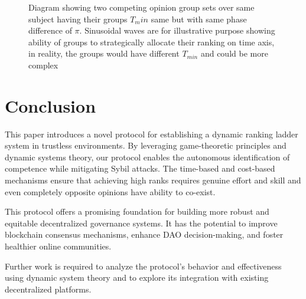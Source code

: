 \documentclass{article}
\begin{document}
\begin{CJK}{UTF8}{gbsn}
\begin{figure}[ht]
\begin{tikzpicture}
        \end{tikzpicture}
        \caption{Diagram showing two competing opinion group sets over same subject having their groups $T_min$ same but with same phase difference of $\pi$. Sinusoidal waves are for illustrative purpose showing ability of groups to strategically allocate their ranking on time axis, in reality, the groups would have different $T_{min}$ and could be more complex
            \label{fig:processes-sinusoidal}}
    \end{figure}

    \section{Conclusion}

    This paper introduces a novel protocol for establishing a dynamic ranking ladder system in trustless environments. By leveraging game-theoretic principles and dynamic systems theory, our protocol enables the autonomous identification of competence while mitigating Sybil attacks. The time-based and cost-based mechanisms ensure that achieving high ranks requires genuine effort and skill and even completely opposite opinions have ability to co-exist.

    This protocol offers a promising foundation for building more robust and equitable decentralized governance systems. It has the potential to improve blockchain consensus mechanisms, enhance DAO decision-making, and foster healthier online communities.

    Further work is required to analyze the protocol's behavior and effectiveness using dynamic system theory and to explore its integration with existing decentralized platforms.

    \clearpage

    
    

    \clearpage\end{CJK}
\end{document}
